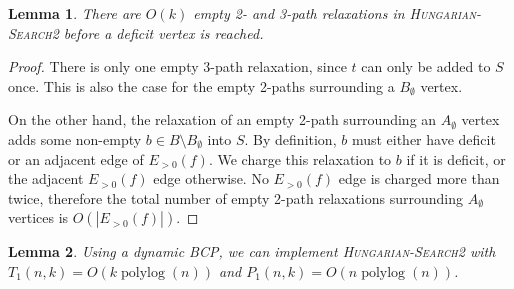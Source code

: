 \documentclass[11pt]{article}
\def\polylog{\mathop{\mathrm{polylog}}}
\theoremstyle{plain}
\newtheorem{lemma}{Lemma}
\begin{document}
\begin{lemma}
\label{lemma:goldberg_hs_length2}
There are $O(k)$ empty 2- and 3-path relaxations in \textsc{Hungarian-Search2}
before a deficit vertex is reached.
\end{lemma}

\begin{proof}
There is only one empty 3-path relaxation, since $t$ can only be added to $S$
once.
This is also the case for the empty 2-paths surrounding a $B_\emptyset$ vertex.

On the other hand, the relaxation of an empty 2-path surrounding an
$A_\emptyset$ vertex adds some non-empty $b \in B \setminus B_\emptyset$ into
$S$.
By definition, $b$ must either have deficit or an adjacent edge of $E_{>0}(f)$.
We charge this relaxation to $b$ if it is deficit, or the adjacent $E_{>0}(f)$
edge otherwise.
No $E_{>0}(f)$ edge is charged more than twice, therefore the total number of
empty 2-path relaxations surrounding $A_\emptyset$ vertices is
$O(|E_{>0}(f)|)$.
\end{proof}







\begin{lemma}
\label{lemma:goldberg_hs_time}
Using a dynamic BCP, we can implement \textsc{Hungarian-Search2} with
$T_1(n, k) = O(k\polylog(n))$ and $P_1(n, k) = O(n\polylog(n))$.
\end{lemma}
\end{document}
